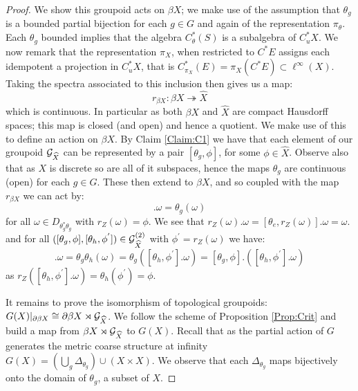 \begin{proof}
We show this groupoid acts on $\beta X$; we make use of the assumption that $\theta_{g}$ is a bounded partial bijection for each $g \in G$ and again of the representation $\pi_{\theta}$. Each $\theta_{g}$ bounded implies that the algebra $C^{*}_{\theta}(S)$ is a subalgebra of $C^{*}_{u}X$. We now remark that the representation $\pi_{X}$, when restricted to $C^{*}E$ assigns each idempotent a projection in $C^{*}_{u}X$, that is $C^{*}_{\pi_{X}}(E)=\pi_{X}(C^{*}E) \subset \ell^{\infty}(X)$. Taking the spectra associated to this inclusion then gives us a map:
\begin{equation*}
r_{\beta X}: \beta X \twoheadrightarrow \widehat{X}
\end{equation*}
which is continuous. In particular as both $\beta X$ and $\widehat{X}$ are compact Hausdorff spaces; this map is closed (and open) and hence a quotient. We make use of this to define an action on $\beta X$. By Claim \ref{Claim:C1} we have that each element of our groupoid $\mathcal{G}_{\widehat{X}}$ can be represented by a pair $[\theta_{g}, \phi]$, for some $\phi \in \widehat{X}$. Observe also that as $X$ is discrete so are all of it subspaces, hence the maps $\theta_{g}$ are continuous (open) for each $g \in G$. These then extend to $\beta X$, and so coupled with the map $r_{\beta X}$ we can act by:
\begin{equation*}
[\theta_{g},\phi].\omega = \theta_{g}(\omega)
\end{equation*}
for all $\omega \in D_{\theta_{g}^{*}\theta_{g}}$ with $r_{Z}(\omega) = \phi$. We see that $r_{Z}(\omega).\omega= [\theta_{e}, r_{Z}(\omega)].\omega = \omega.$ and for all $([\theta_{g},\phi],[\theta_{h},\phi^{'}]) \in \mathcal{G}_{\widehat{X}}^{(2)}$ with $\phi^{'}=r_{Z}(\omega)$ we have:
\begin{equation*}
[\theta_{g}\theta_{h},\phi^{'}].\omega = \theta_{g}\theta_{h}(\omega) = \theta_{g}([\theta_{h},\phi^{'}].\omega)=[\theta_{g},\phi].([\theta_{h},\phi^{'}].\omega)
\end{equation*}
as $r_{Z}([\theta_{h},\phi^{'}].\omega)=\theta_{h}(\phi^{'})=\phi$.

It remains to prove the isomorphism of topological groupoids: $G(X)|_{\partial\beta X} \cong \partial\beta X \rtimes \mathcal{G}_{\widehat{X}}$. We follow the scheme of Proposition \ref{Prop:Crit} and build a map from $\beta X\rtimes \mathcal{G}_{\widehat{X}}$ to $G(X)$. Recall that as the partial action of $G$ generates the metric coarse structure at infinity $G(X)= (\bigcup_{g} \Delta_{\theta_{g}})\cup (X \times X)$. We observe that each $\Delta_{\theta_{g}}$ maps bijectively onto the domain of $\theta_{g}$, a subset of $X$.


\end{proof}

